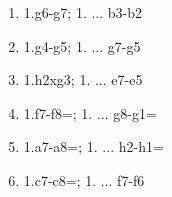 \begin{enumerate}
\setcounter{enumi}{\value{d_counter}}
\item 1.\pawn{}g6-g7\mate{}; 1. ... \pawn{}b3-b2\mate{}
\item 1.\pawn{}g4-g5\mate{}; 1. ... \pawn{}g7-g5\mate{}
\item 1.\pawn{}h2xg3\mate{}; 1. ... \pawn{}e7-e5\mate{}
\item 1.\pawn{}f7-f8=\queen\mate{}; 1. ... \pawn{}g8-g1=\queen\mate{}
\item 1.\pawn{}a7-a8=\knight\mate{}; 1. ... \pawn{}h2-h1=\queen\mate{}
\item 1.\pawn{}c7-c8=\knight\mate{}; 1. ... \pawn{}f7-f6\mate{}
\setcounter{d_counter}{\value{enumi}}
\end{enumerate}